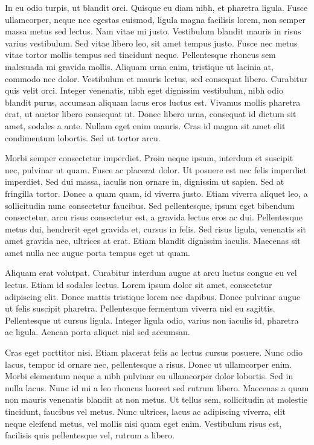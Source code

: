 \documentclass{ritsi/article}
\begin{document}
In eu odio turpis, ut blandit orci. Quisque eu diam nibh, et pharetra ligula. Fusce ullamcorper, neque nec egestas euismod, ligula magna facilisis lorem, non semper massa metus sed lectus. Nam vitae mi justo. Vestibulum blandit mauris in risus varius vestibulum. Sed vitae libero leo, sit amet tempus justo. Fusce nec metus vitae tortor mollis tempus sed tincidunt neque. Pellentesque rhoncus sem malesuada mi gravida mollis. 
Aliquam urna enim, tristique ut lacinia at, commodo nec dolor. Vestibulum et mauris lectus, sed consequat libero. Curabitur quis velit orci. Integer venenatis, nibh eget dignissim vestibulum, nibh odio blandit purus, accumsan aliquam lacus eros luctus est. Vivamus mollis pharetra erat, ut auctor libero consequat ut. Donec libero urna, consequat id dictum sit amet, sodales a ante. Nullam eget enim mauris. Cras id magna sit amet elit condimentum lobortis. Sed ut tortor arcu.

Morbi semper consectetur imperdiet. Proin neque ipsum, interdum et suscipit nec, pulvinar ut quam. Fusce ac placerat dolor. Ut posuere est nec felis imperdiet imperdiet. Sed dui massa, iaculis non ornare in, dignissim ut sapien. Sed at fringilla tortor. Donec a quam quam, id viverra justo. Etiam viverra aliquet leo, a sollicitudin nunc consectetur faucibus. Sed pellentesque, ipsum eget bibendum consectetur, arcu risus consectetur est, a gravida lectus eros ac dui. Pellentesque metus dui, hendrerit eget gravida et, cursus in felis. Sed risus ligula, venenatis sit amet gravida nec, ultrices at erat. Etiam blandit dignissim iaculis. Maecenas sit amet nulla nec augue porta tempus eget ut quam.

Aliquam erat volutpat. Curabitur interdum augue at arcu luctus congue eu vel lectus. Etiam id sodales lectus. Lorem ipsum dolor sit amet, consectetur adipiscing elit. Donec mattis tristique lorem nec dapibus. Donec pulvinar augue ut felis suscipit pharetra. Pellentesque fermentum viverra nisl eu sagittis. Pellentesque ut cursus ligula. Integer ligula odio, varius non iaculis id, pharetra ac ligula. Aenean porta aliquet nisl sed accumsan.

Cras eget porttitor nisi. Etiam placerat felis ac lectus cursus posuere. Nunc odio lacus, tempor id ornare nec, pellentesque a risus. Donec ut ullamcorper enim. Morbi elementum neque a nibh pulvinar eu ullamcorper dolor lobortis. Sed in nulla lacus. Nunc id mi a leo rhoncus laoreet sed rutrum libero. Maecenas a quam non mauris venenatis blandit at non metus. Ut tellus sem, sollicitudin at molestie tincidunt, faucibus vel metus. Nunc ultrices, lacus ac adipiscing viverra, elit neque eleifend metus, vel mollis nisi quam eget enim. Vestibulum risus est, facilisis quis pellentesque vel, rutrum a libero.
\end{document}
